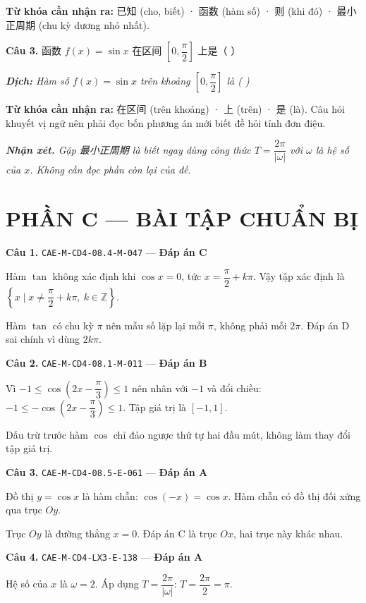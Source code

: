 \documentclass[11pt, a4paper]{article}
\begin{document}
\textbf{Từ khóa cần nhận ra:} 已知 (cho, biết) · 函数 (hàm số) · 则 (khi đó) · 最小正周期 (chu kỳ dương nhỏ nhất).

\textbf{Câu 3.} 函数 $f(x) = \sin x$ 在区间 $\left[0, \dfrac{\pi}{2}\right]$ 上是（ ）

\noindent\emph{\textbf{Dịch:} Hàm số $f(x) = \sin x$ trên khoảng $\left[0, \dfrac{\pi}{2}\right]$ là ( )}

\textbf{Từ khóa cần nhận ra:} 在区间 (trên khoảng) · 上 (trên) · 是 (là). Câu hỏi khuyết vị ngữ nên phải đọc bốn phương án mới biết đề hỏi tính đơn điệu.

\noindent\emph{\textbf{Nhận xét.} Gặp 最小正周期 là biết ngay dùng công thức $T = \dfrac{2\pi}{|\omega|}$ với $\omega$ là hệ số của $x$. Không cần đọc phần còn lại của đề.}

\section{PHẦN C — BÀI TẬP CHUẨN BỊ}

\textbf{Câu 1.} \texttt{CAE-M-CD4-08.4-M-047} — \textbf{Đáp án C}

Hàm $\tan$ không xác định khi $\cos x = 0$, tức $x = \dfrac{\pi}{2} + k\pi$. Vậy tập xác định là $\left\{x \mid x \neq \dfrac{\pi}{2} + k\pi,\ k \in \mathbb{Z}\right\}$.

 Hàm $\tan$ có chu kỳ $\pi$ nên mẫu số lặp lại mỗi $\pi$, không phải mỗi $2\pi$. Đáp án D sai chính vì dùng $2k\pi$.

\textbf{Câu 2.} \texttt{CAE-M-CD4-08.1-M-011} — \textbf{Đáp án B}

Vì $-1 \le \cos\left(2x - \dfrac{\pi}{3}\right) \le 1$ nên nhân với $-1$ và đổi chiều: $-1 \le -\cos\left(2x - \dfrac{\pi}{3}\right) \le 1$. Tập giá trị là $[-1, 1]$.

 Dấu trừ trước hàm $\cos$ chỉ đảo ngược thứ tự hai đầu mút, không làm thay đổi tập giá trị.

\textbf{Câu 3.} \texttt{CAE-M-CD4-08.5-E-061} — \textbf{Đáp án A}

Đồ thị $y = \cos x$ là hàm chẵn: $\cos(-x) = \cos x$. Hàm chẵn có đồ thị đối xứng qua trục $Oy$.

 Trục $Oy$ là đường thẳng $x = 0$. Đáp án C là trục $Ox$, hai trục này khác nhau.

\textbf{Câu 4.} \texttt{CAE-M-CD4-LX3-E-138} — \textbf{Đáp án A}

Hệ số của $x$ là $\omega = 2$. Áp dụng $T = \dfrac{2\pi}{|\omega|}$: $T = \dfrac{2\pi}{2} = \pi$.
\end{document}
